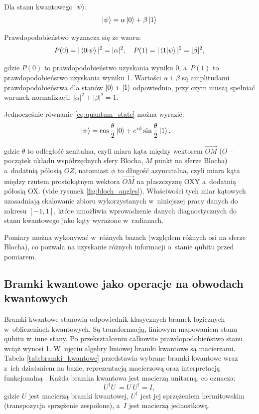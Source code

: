 Dla stanu kwantowego $\ket{\psi}$:
\begin{equation}
\label{eq:quantum_state}
\ket{\psi} = \alpha \ket{0} + \beta \ket{1}
\end{equation}

Prawdopodobieństwo wyznacza się ze wzoru:
\begin{equation}
\label{eq:quantum_prob}
P(0) = |\braket{0|\psi}|^2 = |\alpha|^2, \quad
P(1) = |\braket{1|\psi}|^2 = |\beta|^2,
\end{equation}

gdzie $P(0)$ to prawdopodobieństwo uzyskania wyniku 0, a~$P(1)$ to prawdopodobieństwo uzyskania wyniku 1. Wartości $\alpha$ i~$\beta$ są amplitudami prawdopodobieństwa dla stanów $\ket{0}$ i~$\ket{1}$ odpowiednio, przy czym muszą spełniać warunek normalizacji: $|\alpha|^2 + |\beta|^2 = 1$.

Jednocześnie równanie \ref{eq:quantum_state} można wyrazić:
\begin{equation}
    \ket{\psi} = \cos{\frac{\theta}{2}} \ket{0} + e^{i\phi}\sin{\frac{\theta}{2}} \ket{1}, \quad
\end{equation}

gdzie $\theta$ to odległość zenitalna, czyli miara kąta między wektorem $\vec{OM}$ ($O$ -- początek układu współrzędnych sfery Blocha, $M$ punkt na sferze Blocha) a~dodatnią półosią $OZ$, natomiast $\phi$ to długość azymutalna, czyli miara kąta między rzutem prostokątnym wektora $\vec{OM}$ na płaszczyznę OXY a~dodatnią półosią OX. (vide rysunek \ref{fig:bloch_angles}). Właściwości tych miar kątowych uzasadniają skalowanie zbioru wykorzystanych w~niniejszej pracy danych do zakresu $[-1,1]$, które umożliwia wprowadzenie danych diagnostycznych do stanu kwantowego jako kąty wyrażone w~radianach.

Pomiary można wykonywać w~różnych bazach (względem różnych osi na sferze Blocha), co pozwala na uzyskanie różnych informacji o~stanie qubitu przed pomiarem.

\subsection{Bramki kwantowe jako operacje na obwodach kwantowych}

Bramki kwantowe stanowią odpowiednik klasycznych bramek logicznych w~obliczeniach kwantowych. Są transformacją, liniowym mapowaniem stanu qubitu w~inne stany. Po przekształceniu całkowite prawdopodobieństwo stanu wciąż wynosi 1. W~ujęciu algebry liniowej bramki kwantowe są macierzami. Tabela \ref{tab:bramki_kwantowe} przedstawia wybrane bramki kwantowe wraz z~ich działaniem na bazie, reprezentacją macierzową oraz interpretacją funkcjonalną \cite{quantum_intro}.
Każda bramka kwantowa jest macierzą unitarną, co oznacza:
\[
U^{\dagger} U~= U~U^{\dagger} = I,
\]
gdzie $U$ jest macierzą bramki kwantowej, $U^{\dagger}$ jest jej sprzężeniem hermitowskim (transpozycja sprzężenie zespolone), a~$I$ jest macierzą jednostkową.


